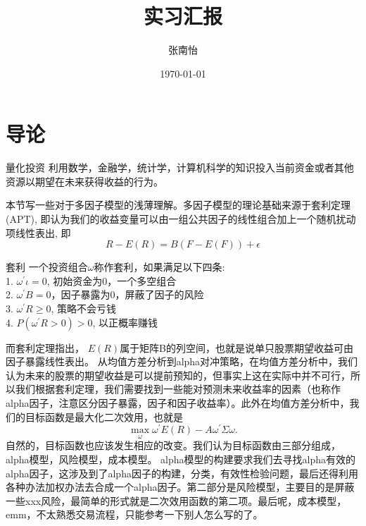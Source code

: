 \documentclass[12pt]{article}
\theoremstyle{definition}
\begin{document}
	\title{实习汇报}
	\author{张南怡}
	\date{\today}
	\maketitle
	\tableofcontents
	\listoffigures
\newpage

\section{导论}
\begin{sdefinition}{量化投资}{}
利用数学，金融学，统计学，计算机科学的知识投入当前资金或者其他资源以期望在未来获得收益的行为。
\end{sdefinition}

本节写一些对于多因子模型的浅薄理解。多因子模型的理论基础来源于套利定理(APT), 即认为我们的收益变量可以由一组公共因子的线性组合加上一个随机扰动项线性表出, 即
$$
R-E(R) = B(F-E(F)) + \epsilon
$$
\begin{sdefinition}{套利}{}
一个投资组合$\omega$称作套利，如果满足以下四条: \\
1. $\omega^\prime \iota=0$, 初始资金为0，一个多空组合 \\
2. $\omega^\prime B=0$，因子暴露为0，屏蔽了因子的风险 \\
3. $\omega^\prime R\geq 0$, 策略不会亏钱 \\
4. $P(\omega^\prime R >0)>0$, 以正概率赚钱
\end{sdefinition}
而套利定理指出，
$E(R)$属于矩阵B的列空间，也就是说单只股票期望收益可由因子暴露线性表出。
从均值方差分析到alpha对冲策略，在均值方差分析中，我们认为未来的股票的期望收益是可以提前预知的，但事实上这在实际中并不可行，所以我们根据套利定理，我们需要找到一些能对预测未来收益率的因素（也称作alpha因子，注意区分因子暴露，因子和因子收益率）。此外在均值方差分析中，我们的目标函数是最大化二次效用，也就是
$$
\max_{\omega} \omega^\prime E(R) - A\omega^\prime \Sigma \omega.
$$
自然的，目标函数也应该发生相应的改变。我们认为目标函数由三部分组成，alpha模型，风险模型，成本模型。
alpha模型的构建要求我们去寻找alpha有效的alpha因子，这涉及到了alpha因子的构建，分类，有效性检验问题，最后还得利用各种办法加权办法去合成一个alpha因子。第二部分是风险模型，主要目的是屏蔽一些xxx风险，最简单的形式就是二次效用函数的第二项。最后呢，成本模型，emm，不太熟悉交易流程，只能参考一下别人怎么写的了。
\end{document}
